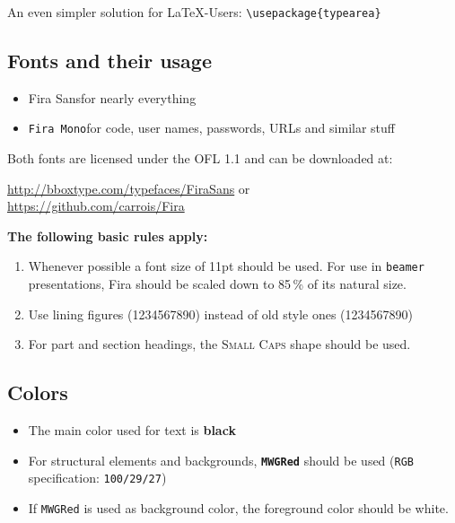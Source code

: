 \documentclass[abstracton]{scrartcl}
\begin{document}
    An even simpler solution for \LaTeX-Users: \verb|\usepackage{typearea}|
    
    
    \subsection{Fonts and their usage}
    \begin{itemize}\itemsep0pt
        \item Fira Sans\quad for nearly everything
        \item \texttt{Fira Mono}\quad for code, user names, passwords, URLs and similar stuff
    \end{itemize}
    
    \medskip
    Both fonts are licensed under the OFL 1.1 and can be downloaded at:
    \begin{center}
        \url{http://bboxtype.com/typefaces/FiraSans} or \\
        \url{https://github.com/carrois/Fira}
    \end{center}
    
    \medskip
    \textbf{The following basic rules apply:} \nopagebreak
    \begin{enumerate}
        \item Whenever possible a font size of 11pt should be used.
            For use in \texttt{beamer} presentations, Fira should be scaled down to 85\,\% of its natural size.
        
        \item Use lining figures (1234567890) instead of old style ones (1234567890)
        
        \item For part and section headings, the \textsc{Small Caps} shape should be used.
    \end{enumerate}
    
    
    \subsection{Colors}
    \begin{itemize}
        \item The main color used for text is \textbf{black}
        \item For structural elements and backgrounds, \textbf{\color{MWGRed}\texttt{MWGRed}} should be used (\texttt{RGB} specification: \texttt{100/29/27})
        \item If {\color{MWGRed}\texttt{MWGRed}} is used as background color, the foreground color should be white.
    \end{itemize}
    
    
\end{document}
